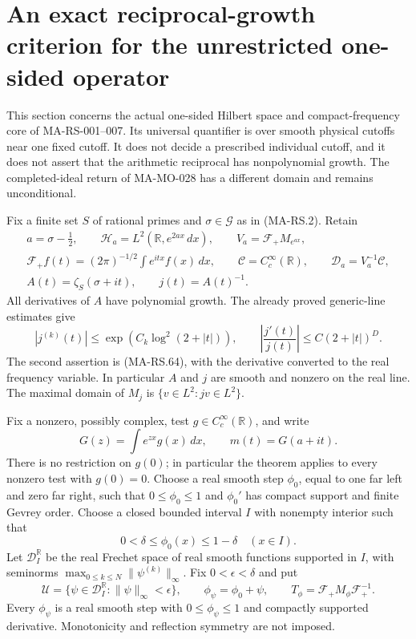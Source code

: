 \section{An exact reciprocal-growth criterion for the unrestricted one-sided operator}
\label{sec:reciprocal-growth-criterion}

This section concerns the actual one-sided Hilbert space and
compact-frequency core of MA-RS-001--007.  Its universal quantifier
is over smooth physical cutoffs near one fixed cutoff.  It does
not decide a prescribed individual cutoff, and it does not
assert that the arithmetic reciprocal has nonpolynomial growth.
The completed-ideal return of MA-MO-028 has a different domain
and remains unconditional.

Fix a finite set \(S\) of rational primes and
\(\sigma\in\mathscr G\) as in (MA-RS.2).  Retain
\[
\begin{gathered}
 a=\sigma-\tfrac12,\qquad
 \mathcal H_a=L^2(\mathbb R,e^{2ax}\,dx),\qquad
 V_a=\mathcal F_+M_{e^{ax}},\\
 \mathcal F_+f(t)=(2\pi)^{-1/2}\int e^{itx}f(x)\,dx,\qquad
 \mathscr C=C_c^\infty(\mathbb R),\qquad
 \mathscr D_a=V_a^{-1}\mathscr C,\\
 A(t)=\zeta_S(\sigma+it),\qquad j(t)=A(t)^{-1}.
\end{gathered}
\tag{MA-MO.1000}
\]
All derivatives of \(A\) have polynomial growth.  The
already proved generic-line estimates give
\[
 |j^{(k)}(t)|\le
       \exp(C_k\log^2(2+|t|)),\qquad
 \left|\frac{j'(t)}{j(t)}\right|
                       \le C(2+|t|)^D .
\tag{MA-MO.1001}
\]
The second assertion is (MA-RS.64), with the derivative
converted to the real frequency variable.  In particular
\(A\) and \(j\) are smooth and nonzero on the real line.
The maximal domain of \(M_j\) is
\(\{v\in L^2:jv\in L^2\}\).

Fix a nonzero, possibly complex, test
\(g\in C_c^\infty(\mathbb R)\), and write
\[
 G(z)=\int e^{zx}g(x)\,dx,\qquad m(t)=G(a+it).
\tag{MA-MO.1002}
\]
There is no restriction on \(g(0)\); in particular the
theorem applies to every nonzero test with \(g(0)=0\).
Choose a real smooth step \(\phi_0\), equal to one
far left and zero far right, such that
\(0\le\phi_0\le1\) and \(\phi_0'\) has compact support
and finite Gevrey order.  Choose a closed bounded
interval \(I\) with nonempty interior such that
\[
 0<\delta\le\phi_0(x)\le1-\delta\quad(x\in I).
\]
Let \(\mathscr D_I^\mathbb R\) be the real Frechet
space of real smooth functions supported in \(I\), with
seminorms \(\max_{0\le k\le N}\|\psi^{(k)}\|_\infty\).
Fix \(0<\epsilon<\delta\) and put
\[
 \mathscr U=\{\psi\in\mathscr D_I^\mathbb R:
                         \|\psi\|_\infty<\epsilon\},\qquad
 \phi_\psi=\phi_0+\psi,\qquad
 T_\phi=\mathcal F_+M_\phi\mathcal F_+^{-1}.
\tag{MA-MO.1003}
\]
Every \(\phi_\psi\) is a real smooth step with
\(0\le\phi_\psi\le1\) and compactly supported derivative.
Monotonicity and reflection symmetry are not imposed.

